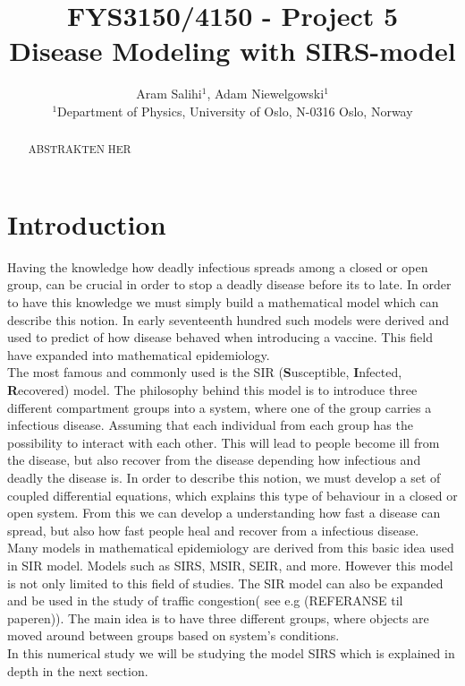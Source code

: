 \documentclass[a4paper, 10pt]{article}
\title{FYS3150/4150 - Project 5 \\
  Disease Modeling with SIRS-model}
\author{Aram Salihi$^1$, Adam Niewelgowski$^1$ \\
  \small $^1$Department of Physics, University of Oslo, N-0316 Oslo, Norway}
\begin{document}
\maketitle
\begin{abstract}
ABSTRAKTEN HER
\end{abstract}
\tableofcontents
\newpage
\section{Introduction}
Having the knowledge how deadly infectious spreads among a closed or open group,
can be crucial in order to stop a deadly disease before its to late. In order to have
this knowledge we must simply build a mathematical model which can describe this notion.
In early seventeenth hundred such models were derived and used to predict of how disease behaved
when introducing a vaccine. This field have expanded into mathematical epidemiology.
\vspace{3mm}
\\
The most famous and
commonly used is the SIR (\textbf{S}usceptible, \textbf{I}nfected, \textbf{R}ecovered) model.
The philosophy behind this model is to introduce three different compartment groups into a system,
where one of the group carries a infectious disease. Assuming that each individual from each group has the possibility
to interact with each other. This will lead to people become ill from the disease, but also recover from the disease
depending how infectious and deadly the disease is. In order to describe this notion, we must develop
a set of coupled differential equations, which explains this type of behaviour in a closed or open system.
From this we can develop a understanding
how fast a disease can spread, but also how fast people heal and recover from a infectious disease.
\vspace{3mm}
\\
Many models in mathematical epidemiology are derived from this basic idea used in SIR model. Models such as SIRS, MSIR, SEIR, and more.
However this model is not only
limited to this field of studies. The SIR model can also be expanded and be used in the study of
traffic congestion( see e.g (REFERANSE til paperen)). The main
idea is to have three different groups, where objects are moved around between
groups based on system's conditions.
\vspace{3mm}
\\
In this numerical study we will be studying the model SIRS which is explained in depth in the next section.
\end{document}
